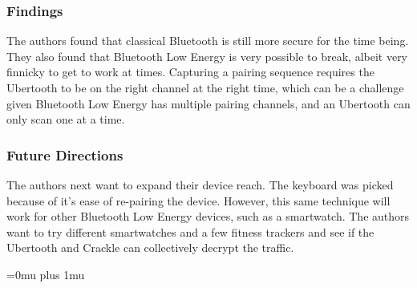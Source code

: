 \subsubsection{Findings}

\noindent
The authors found that classical Bluetooth is still more secure for the time being.  They also found that Bluetooth Low Energy is very possible to break, albeit very finnicky to get to work at times.  Capturing a pairing sequence requires the Ubertooth to be on the right channel at the right time, which can be a challenge given Bluetooth Low Energy has multiple pairing channels, and an Ubertooth can only scan one at a time.

\subsubsection{Future Directions}

\noindent
The authors next want to expand their device reach.  The keyboard was picked because of it's ease of re-pairing the device.  However, this same technique will work for other Bluetooth Low Energy devices, such as a smartwatch.  The authors want to try different smartwatches and a few fitness trackers and see if the Ubertooth and Crackle can collectively decrypt the traffic.

\Urlmuskip=0mu plus 1mu\relax

\pagebreak